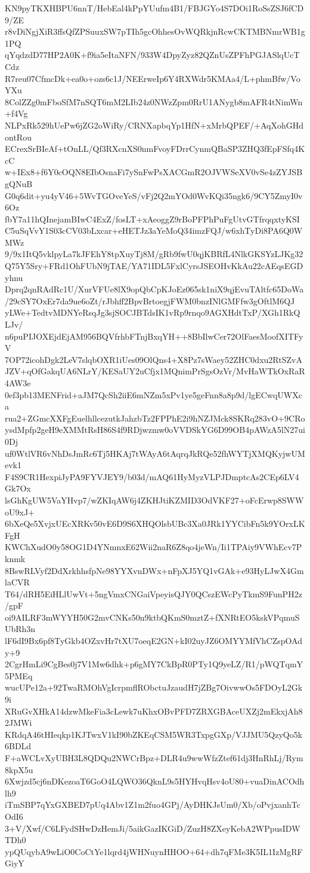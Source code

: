 KN9pyTKXHBPU6nnT/HebEal4kPpYUufm4B1/FBJGYo4S7DOi1RoSsZSJ6fCD9/ZE
r8vDiNgjXiR3ffsQfZPSuuxSW7pTIh5gcOhhesOvWQRkjnRcwCKTMBNmrWB1g1PQ
qYqdzdD77HP2A0K+f9ia5eItaNFN/933W4DpyZyz82QZnUsZPFhPGJASlqUcTCdz
R7reu07CfmcDk+ea0o+ozs6c1J/NEErweIp6Y4RXWdr5KMAa4/L+phmBfw/VoYXu
8ColZZg0mFboSfM7nSQT6mM2LIb24z0NWzZpm0RrU1ANygb8mAFR4tNimWn+f4Vg
NLPxRk529hUePw6jZG2oWiRy/CRNXapbqYp1HfN+xMrbQPEF/+AqXohGHdontRou
ECrexSrBIeAf+tOnLL/Qf3RXcnXS0nmFvoyFDrrCynmQBaSP3ZHQ3fEpFSfq4KcC
w+IEx8+f6Y0cOQN8EIbOsnaFi7ySnFwPsXACGmR2OJVWSeXV0vSe4zZYJSBgQNuB
G0q6dit+yu4yV46+5WvTGOveYeS/vFj2Q2mYOd0WvKQi35ngk6/9CY5ZmyI0v6Oz
fbY7a11hQInejamBIwC4ExZ/fosLT+xAeoggZ9rBoPFPhPuFgUtvGTfrqqxtyKSI
C5uSqVvY1S03cCV03bLxcar+eHETJz3aYeMoQ34imzFQJ/w6xhTyDi8PA6Q0WMWz
9/9x1ItQ5vklpyLa7kJFEhY8tpXuyTj8M/gRb9fwU0qjKBRfL4NlkGKSYzLJKg32
Q75Y5Sry+FRd1OhFUbN9jTAE/YA71IDL5FxlCyrsJSEOHvKkAu22cAEqsEGDyhnu
Dprq2qnRAdRc1U/XurVFUe8lX9opQbCpKJoEz065sk1niX9qjEvuTAltfc65DoWa
/29cSY7OxEr7da9ue6oZt/rJbhff2BpvBrtoegjFWM0bnzINlGMFfw3gOftlM6QJ
yLWe+TedtvMDNYeRsqJg3sjSOCJBTdsIK1vRp9rnqo9AGXHdtTxP/XGh1RkQLJv/
n6puPIJOXEjdEjAM956BQVfrhbFTnjBxqYH++8BbIlwCer72OlFaesMoofXITFyV
7OP72icohDgk2LeV7slqbOXR1iUes09OlQns4+X8Pz7sWaey52ZHC0dxu2RtSZvA
JZV+qOfGakqUA6NLrY/KESaUY2uCfjx1MQnimPrSgsOzVr/MvHaWTkOxRaR4AW3e
0ef3pb13MENFrid+aJM7QcSh2iiE6mNZm5xPv1ye5geFnn8a8p9d/lgECwqUWXca
rua2+ZGmcXXFgEuelhllcezutkJahzbTz2FPPhE2i9hNZJMck8SKRq283vO+9CRo
ysdMpfp2geH9eXMMtRsH86S4f9RDjwzmw0oVVDSkYG6D99OB4pAWzA5lN27ui0Dj
uf0WtlVR6vNhDsJmRc6Tj5HKAj7tWAyA6tAqrqJkRQe52fhWYTjXMQKyjwUMevk1
F4S9CR1HexpiJyPA9FYVJEY9/b03d/mAQ61HyMyzVLPJDmptcAs2CEp6LV4Gk7Ox
lsGhKgUW5VaYHvp7/wZKIqAW6j4ZKHJtiKZMID3OdVKF27+oFcErwp8SWWoU9xJ+
6bXeQe5XvjxUEcXRKv50vE6D9S6XHQOlsbUBc3Xa0JRk1YYCibFn5k9YOrxLKFgH
KWChXudO0y58OG1D4YNmnxE62Wii2naR6Z8qo4jeWn/Ii1TPAiy9VWhEcv7Pknmk
8BswRLVyf2DdXrkhhsfpNe98YYXvnDWx+nFpXJ5YQ1vGAk+e93HyLJwX4GmlaCVR
T64/dRH5EiHLlUwVt+5ngVmxCNGaiVpeyisQJY0QCszEWcPyTkmS9FunPH2z/gpF
oi9AILRF3mWYYH50G2mvCNKs50n9ktbQKmS0mztZ+fXNRtEO5kskVPqmuSUbRh3n
lF6dI9Bx6pf8TyGkb4OZxvHr7tXU7oeqE2GN+kI02uyJZ6OMYYMfVhCZspOAdy+9
2CgrHmLi9CgBes0j7V1Mw6dhk+p6gMY7CkBpR0PTy1Q9yeLZ/R1/pWQTqmY5PMEq
wucUPe12a+92TwaRMOhVgIcrpmflRObctuJzaudH7jZBg7OivwwOs5FDOyL2Gk9i
XRuGvXHkA14dzwMkeFia3cLewk7uKhxOBvPFD7ZRXGBAceUXZj2mEkxjAh82JMWi
KRdqA46tHIeqkp1KJTwxV1kI90bZKEqCSM5WR3TxpgGXp/VJJMU5QzyQo5k6BDLd
F+aWCLvXyUBH3L8QDQu2NWCrBpz+DLR4u9wwWfzZtef61dj3HnRhLj/Rym8kpX5u
6Xwjzd5cj6nDKezoaT6GoO4LQWO36QknL9s5HYHvqHsv4oU80+vuaDinACOdhlh9
iTmSBP7qYxGXBED7pUq4Abv1Z1m2fuo4GPj/AyDHKJsUm0/Xb/oPvjxanhTcOdI6
3+V/Xwf/C6LFydSHwDzHemJi/5aikGazIKGiD/ZuzH8ZXeyKebA2WPpusIDWTDh0
ypQUqybA9wLiO0CoCtYe1lqrd4jWHNuynHHOO+64+dh7qFMe3K5IL1IzMgRFGiyY
